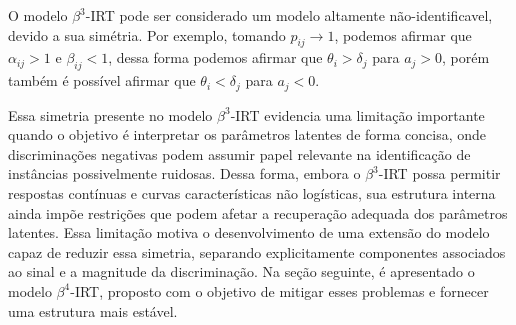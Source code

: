 O modelo $\beta^3$-\gls{IRT} pode ser considerado um modelo altamente não-identificavel, devido a sua simétria\cite{nishihara2013detecting}. Por exemplo, tomando $p_{ij} \rightarrow 1$, podemos afirmar que $\alpha_{ij} > 1$ e $\beta_{ij} < 1$, dessa forma podemos afirmar que $\theta_i > \delta_j$ para $a_j > 0$, porém também é possível afirmar que $\theta_i < \delta_j$ para $a_j < 0$.

Essa simetria presente no modelo $\beta^3$-\gls{IRT} evidencia uma limitação importante quando o objetivo é interpretar os parâmetros latentes de forma concisa, onde discriminações negativas podem assumir papel relevante na identificação de instâncias possivelmente ruidosas. Dessa forma, embora o $\beta^3$-\gls{IRT} possa permitir respostas contínuas e curvas características não logísticas, sua estrutura interna ainda impõe restrições que podem afetar a recuperação adequada dos parâmetros latentes. Essa limitação motiva o desenvolvimento de uma extensão do modelo capaz de reduzir essa simetria, separando explicitamente componentes associados ao sinal e a magnitude da discriminação. Na seção seguinte, é apresentado o modelo $\beta^4$-\gls{IRT}, proposto com o objetivo de mitigar esses problemas e fornecer uma estrutura mais estável.





% 

% 






